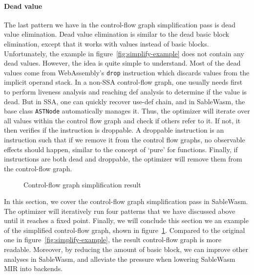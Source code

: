 \paragraph{Dead value}
The last pattern we have in the control-flow graph simplification pass is dead value elimination. Dead value elimination is similar to the dead basic block elimination, except that it works with values instead of basic blocks. Unfortunately, the example in figure~\ref{fig:simplify-example} does not contain any dead values. However, the idea is quite simple to understand. Most of the dead values come from WebAssembly's \texttt{drop} instruction which discards values from the implicit operand stack. In a non-SSA control-flow graph, one usually needs first to perform liveness analysis and reaching def analysis to determine if the value is dead. But in SSA, one can quickly recover use-def chain, and in SableWasm, the base class \texttt{ASTNode} automatically manages it. Thus, the optimizer will iterate over all values within the control flow graph and check if others refer to it. If not, it then verifies if the instruction is droppable. A droppable instruction is an instruction such that if we remove it from the control flow graphs, no observable effects should happen, similar to the concept of `pure' for functions. Finally, if instructions are both dead and droppable, the optimizer will remove them from the control-flow graph.

\begin{figure}
    
    \caption{Control-flow graph simplification result}
    \label{fig:simplify-result}
\end{figure}

In this section, we cover the control-flow graph simplification pass in SableWasm. The optimizer will iteratively run four patterns that we have discussed above until it reaches a fixed point. Finally, we will conclude this section we an example of the simplified control-flow graph, shown in figure~\ref{fig:simplify-result}. Compared to the original one in figure~\ref{fig:simplify-example}, the result control-flow graph is more readable. Moreover, by reducing the amount of basic block, we can improve other analyses in SableWasm, and alleviate the pressure when lowering SableWasm MIR into backends.
